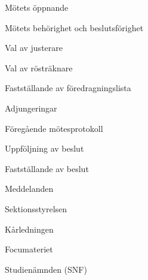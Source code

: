 \documentclass[slutlig]{sektionsmote}
\begin{document}
\maketitle

\begin{ootd}

\item{Mötets öppnande}

\item{Mötets behörighet och beslutsförighet}

\item{Val av justerare}

\item{Val av rösträknare}

\item{Fastställande av föredragningslista}

\item{Adjungeringar}

\item{Föregående mötesprotokoll}

\item{Uppföljning av beslut}

\item{Fastställande av beslut}

\item{Meddelanden}
\begin{ootd}
    \item Sektionsstyrelsen
    \item Kårledningen
    \item Focumateriet
    \item Studienämnden (SNF)
\end{ootd}


\end{ootd}
\end{document}
